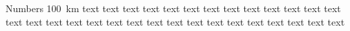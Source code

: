 \documentclass{IEEEtran}
\begin{document}
Numbers \SI{100}{\km}
text text text text text text text text text text text text text text text
text text text text text text text text text text text text text text text
\end{document}
